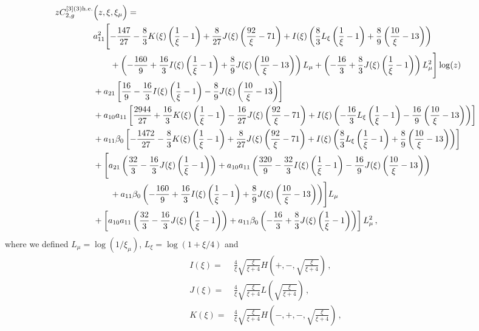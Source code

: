\documentclass[a4paper]{article}
\begin{document}
\begin{align}
		z C_{2,g}^{[3](3) \rm h.e.}&\Bigl(z,\xi,\xi_\mu\Bigr)= \notag \\
		& a_{11}^2\Biggl[-\frac{147}{27} - \frac{8}{3} K(\xi) \left(\frac{1}{\xi}-1\right) + \frac{8}{27} J(\xi) \left(\frac{92}{\xi} - 71\right) + I(\xi) \left(\frac{8}{3} L_\xi \left(\frac{1}{\xi}-1\right) + \frac{8}{9} \left(\frac{10}{\xi} - 13\right)\right) \notag\\
		& \qquad + \left(-\frac{160}{9} + \frac{16}{3} I(\xi) \left(\frac{1}{\xi}-1\right) + \frac{8}{9} J(\xi) \left(\frac{10}{\xi} - 13\right)\right) L_\mu + \left(-\frac{16}{3} + \frac{8}{3} J(\xi) \left(\frac{1}{\xi}-1\right)\right) L_\mu^2\Biggr] \log(z) \notag\\
		& + a_{21} \left[\frac{16}{9} - \frac{16}{3} I(\xi) \left(\frac{1}{\xi}-1\right) - \frac{8}{9} J(\xi) \left(\frac{10}{\xi} - 13\right)\right] \notag\\
		& + a_{10} a_{11} \left[\frac{2944}{27} + \frac{16}{3} K(\xi) \left(\frac{1}{\xi}-1\right) - \frac{16}{27} J(\xi) \left(\frac{92}{\xi} - 71\right) + I(\xi) \left(-\frac{16}{3} L_\xi \left(\frac{1}{\xi}-1\right) - \frac{16}{9} \left(\frac{10}{\xi} - 13\right)\right)\right] \notag\\
		& + a_{11} \beta_0 \left[-\frac{1472}{27} - \frac{8}{3} K(\xi) \left(\frac{1}{\xi}-1\right) + \frac{8}{27} J(\xi) \left(\frac{92}{\xi} - 71\right) + I(\xi) \left(\frac{8}{3} L_\xi \left(\frac{1}{\xi}-1\right) + \frac{8}{9} \left(\frac{10}{\xi} - 13\right)\right)\right] \notag\\
		& + \Biggl[a_{21} \left(\frac{32}{3} - \frac{16}{3} J(\xi) \left(\frac{1}{\xi}-1\right) \right) + a_{10} a_{11} \left(\frac{320}{9} - \frac{32}{3} I(\xi) \left(\frac{1}{\xi}-1\right) - \frac{16}{9} J(\xi) \left(\frac{10}{\xi} - 13\right)\right) \notag\\
		& \qquad+ a_{11} \beta_0 \left(-\frac{160}{9} + \frac{16}{3} I(\xi) \left(\frac{1}{\xi}-1\right) + \frac{8}{9} J(\xi) \left(\frac{10}{\xi} - 13\right)\right) \Biggr] L_\mu \notag\\
		& + \left[ a_{10} a_{11} \left(\frac{32}{3} - \frac{16}{3} J(\xi) \left(\frac{1}{\xi}-1 \right)\right) + a_{11} \beta_0 \left(-\frac{16}{3} + \frac{8}{3} J(\xi) \left(\frac{1}{\xi}-1\right)\right)\right] L_\mu^2\,, \label{C2_g3}
\end{align}
\endgroup
where we defined $L_\mu = \log\left(1/\xi_\mu\right)$, $L_\xi=\log\left(1 + \xi/4\right)$ and
\begin{equation}
	\begin{split}
    I(\xi)=&\frac{4}{\xi}\sqrt{\frac{\xi}{\xi+4}}H \left(+,-,\sqrt{\frac{\xi}{\xi+4}}\right)\,, \\
    J(\xi)=&\frac{4}{\xi}\sqrt{\frac{\xi}{\xi+4}}L\left(\sqrt{\frac{\xi}{\xi+4}}\right)\,, \\
    K(\xi)=&\frac{4}{\xi}\sqrt{\frac{\xi}{\xi+4}}H\left(-,+,-,\sqrt{\frac{\xi}{\xi+4}}\right)\,,
	\end{split}
\end{equation}
\end{document}
